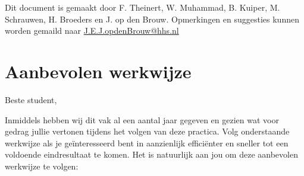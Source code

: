 \documentclass[a4paper,10pt,fleqn,twoside]{article}
\begin{document}
\tableofcontents
\vfill
Dit document is gemaakt door F. Theinert, W. Muhammad, B. Kuiper, M. Schrauwen, H. Broeders en J. op den Brouw.
Opmerkingen en suggesties kunnen worden gemaild naar \href{mailto:J.E.J.opdenBrouw@hhs.nl}{J.E.J.opdenBrouw@hhs.nl}



\section*{Aanbevolen werkwijze}

Beste student,

Inmiddels hebben wij dit vak al een aantal jaar gegeven en gezien wat voor gedrag jullie vertonen tijdens het volgen van deze practica. Volg onderstaande werkwijze als je geïnteresseerd bent in aanzienlijk efficiënter en sneller tot een voldoende eindresultaat te komen. Het is natuurlijk aan jou om deze aanbevolen werkwijze te volgen:
\end{document}
